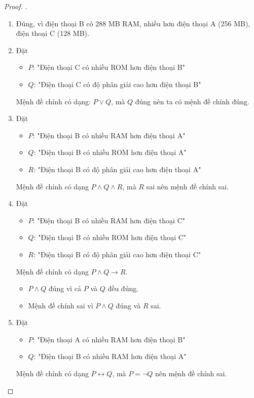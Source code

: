 \begin{proof}.
    \begin{enumerate}[label=\alph*)]
        \item Đúng, vì điện thoại B có 288 MB RAM, nhiều hơn điện thoại A (256 MB), điện thoại C (128 MB).
        \item Đặt \begin{itemize}
            \item $P$: "Điện thoại C có nhiều ROM hơn điện thoại B"
            \item $Q$: "Điện thoại C có độ phân giải cao hơn điện thoại B"
        \end{itemize}
        Mệnh đề chính có dạng: $P\lor Q$, mà $Q$ đúng nên ta có mệnh đề chính đúng.
        \item Đặt \begin{itemize}
            \item $P$: "Điện thoại B có nhiều RAM hơn điện thoại A"
            \item $Q$: "Điện thoại B có nhiều ROM hơn điện thoại A"
            \item $R$: "Điện thoại B có độ phân giải cao hơn điện thoại A"
        \end{itemize}
        Mệnh đề chính có dạng $P\land Q\land R$, mà $R$ sai nên mệnh đề chính sai.
        \item Đặt \begin{itemize}
            \item $P$: "Điện thoại B có nhiều RAM hơn điện thoại C"
            \item $Q$: "Điện thoại B có nhiều ROM hơn điện thoại C"
            \item $R$: "Điện thoại B có độ phân giải cao hơn điện thoại C"
        \end{itemize}
        Mệnh đề chính có dạng $P\land Q\rightarrow R$.\begin{itemize}
            \item $P\land Q$ đúng vì cả $P$ và $Q$ đều đúng.
            \item Mệnh đề chính sai vì $P\land Q$ đúng và $R$ sai.
        \end{itemize}
        \item Đặt \begin{itemize}
            \item $P$: "Điện thoại A có nhiều RAM hơn điện thoại B"
            \item $Q$: "Điện thoại B có nhiều RAM hơn điện thoại A"
        \end{itemize}
        Mệnh đề chính có dạng $P\leftrightarrow Q$, mà $P=\neg Q$ nên mệnh đề chính sai.
    \end{enumerate}
\end{proof}
